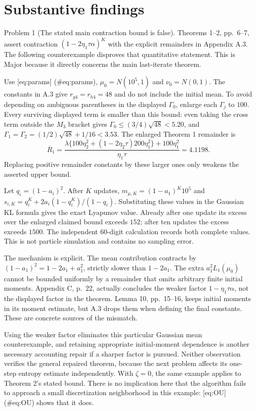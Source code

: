 \documentclass[10pt]{article}
\begin{document}
\section*{Substantive findings}
Problem 1 (The stated main contraction bound is false).  Theorems 1–2, pp. 6–7, assert contraction \((1-2\eta_1\tau\alpha)^K\) with the explicit remainders in Appendix A.3. The following counterexample disproves that quantitative statement. This is Major because it directly concerns the main last-iterate theorem.\par
Use [eq:params] (\#eq:params), \(\mu_0=N(10^5,1)\) and \(\nu_0=N(0,1)\). The constants in A.3 give \(r_{g4}=r_{h4}=48\) and do not include the initial mean. To avoid depending on ambiguous parentheses in the displayed \(\Gamma_0\), enlarge each \(\Gamma_j\) to \(100\). Every surviving displayed term is smaller than this bound: even taking the cross term outside the \(M_3\) bracket gives \(\Gamma_0\leq(3/4)\sqrt{48}<5.20\), and \(\Gamma_1=\Gamma_2=(1/2)\sqrt{48}+1/16<3.53\). The enlarged Theorem 1 remainder is \[\overline R_1=
 \frac{\lambda\{100\eta_2^2+(1-2\eta_2\tau)200\eta_1^2\}
       +100\eta_1^2}{\eta_1\tau}=4.1198.\] Replacing positive remainder constants by these larger ones only weakens the asserted upper bound.\par
Let \(q_i=(1-a_i)^2\). After \(K\) updates, \(m_{\mu,K}=(1-a_1)^K10^5\) and \(s_{i,K}=q_i^K+2a_i(1-q_i^K)/(1-q_i)\). Substituting these values in the Gaussian KL formula gives the exact Lyapunov value. Already after one update its excess over the enlarged claimed bound exceeds \(152\); after ten updates the excess exceeds \(1500\). The independent 60-digit calculation records both complete values. This is not particle simulation and contains no sampling error.\par
The mechanism is explicit. The mean contribution contracts by \((1-a_1)^2=1-2a_1+a_1^2\), strictly slower than \(1-2a_1\). The extra \(a_1^2L_1(\mu_0)\) cannot be bounded uniformly by a remainder that omits arbitrary finite initial moments. Appendix C, p. 22, actually concludes the weaker factor \(1-\eta_1\tau\alpha\), not the displayed factor in the theorem. Lemma 10, pp. 15–16, keeps initial moments in its moment estimate, but A.3 drops them when defining the final constants. These are concrete sources of the mismatch.\par
Using the weaker factor eliminates this particular Gaussian mean counterexample, and retaining appropriate initial-moment dependence is another necessary accounting repair if a sharper factor is pursued. Neither observation verifies the general repaired theorem, because the next problem affects its one-step entropy estimate independently. With \(\zeta=0\), the same example applies to Theorem 2’s stated bound. There is no implication here that the algorithm fails to approach a small discretization neighborhood in this example: [eq:OU] (\#eq:OU) shows that it does.\par
\end{document}
